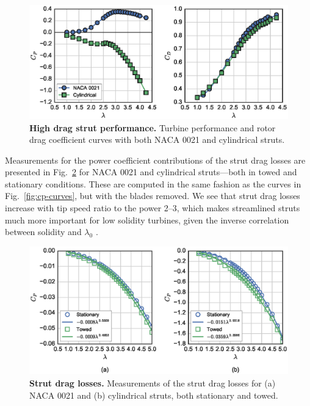 \documentclass[10pt,letterpaper]{article}
\begin{document}
\begin{figure}
    \includegraphics[width=\textwidth]{figures/perf_covers.eps}
    
    \caption{{\bf High drag strut performance.} Turbine performance and rotor
        drag coefficient curves with both NACA 0021 and cylindrical struts.}
    
    \label{fig:perf-covers}
\end{figure}

Measurements for the power coefficient contributions of the strut drag losses
are presented in Fig.~\ref{fig:no-blades} for NACA 0021 and cylindrical
struts---both in towed and stationary conditions. These are computed in the same
fashion as the curves in Fig.~\ref{fig:cp-curves}, but with the blades removed.
We see that strut drag losses increase with tip speed ratio to the power 2--3,
which makes streamlined struts much more important for low solidity turbines,
given the inverse correlation between solidity and $\lambda_0$
\cite{Templin1974}.

\begin{figure}
    \includegraphics[width=\textwidth]{figures/no_blades_all.eps}
    
    \caption{{\bf Strut drag losses.} Measurements of the strut drag losses for
        (a) NACA 0021 and (b) cylindrical struts, both stationary and towed.}
    
    \label{fig:no-blades}
\end{figure}
\end{document}

